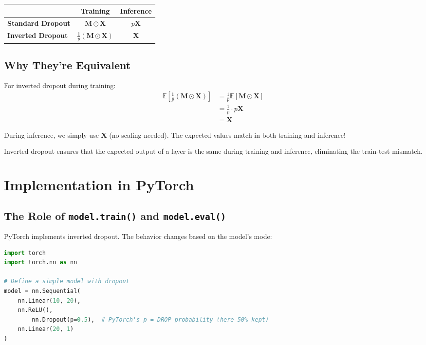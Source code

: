 \begin{notechapter}
\begin{center}
\begin{tabular}{|l|c|c|}
\hline
& \textbf{Training} & \textbf{Inference} \\
\hline
\textbf{Standard Dropout} & $\mathbf{M} \odot \mathbf{X}$ & $p\mathbf{X}$ \\
\hline
\textbf{Inverted Dropout} & $\frac{1}{p}(\mathbf{M} \odot \mathbf{X})$ & $\mathbf{X}$ \\
\hline
\end{tabular}
\end{center}

\subsection{Why They're Equivalent}

For inverted dropout during training:
\begin{align}
\mathbb{E}\left[\frac{1}{p}(\mathbf{M} \odot \mathbf{X})\right] &= \frac{1}{p} \mathbb{E}[\mathbf{M} \odot \mathbf{X}] \\
&= \frac{1}{p} \cdot p\mathbf{X} \\
&= \mathbf{X}
\end{align}

During inference, we simply use $\mathbf{X}$ (no scaling needed). The expected values match in both training and inference!

\begin{proposition}
Inverted dropout ensures that the expected output of a layer is the same during training and inference, eliminating the train-test mismatch.
\end{proposition}

\section{Implementation in PyTorch}

\subsection{The Role of \texttt{model.train()} and \texttt{model.eval()}}

PyTorch implements inverted dropout. The behavior changes based on the model's mode:

\begin{lstlisting}[language=Python]
import torch
import torch.nn as nn

# Define a simple model with dropout
model = nn.Sequential(
    nn.Linear(10, 20),
    nn.ReLU(),
        nn.Dropout(p=0.5),  # PyTorch's p = DROP probability (here 50% kept)
    nn.Linear(20, 1)
)


\end{lstlisting}
\end{notechapter}
